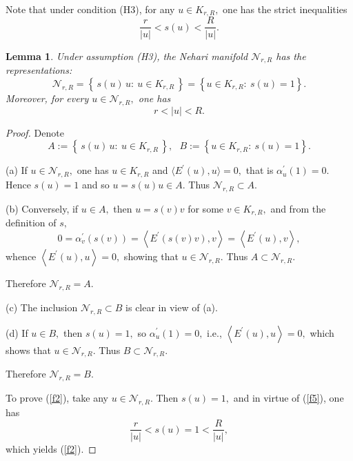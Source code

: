 \documentclass{birkjour}
\newtheorem{lemma}[theorem]{Lemma}
\theoremstyle{definition}
\theoremstyle{remark}
\numberwithin{equation}{section}
\begin{document}
Note that under condition (H3), for any $u\in K_{r,R},$ one has the strict
inequalities%
\begin{equation}
\frac{r}{|u|}<s\left( u\right) <\frac{R}{|u|}.  \label{f5}
\end{equation}

\begin{lemma}
\label{lc copy(1)}Under assumption (H3), the Nehari manifold $\mathcal{N}%
_{r,R}$ has the representations:
\begin{equation*}
\mathcal{N}_{r,R}=\left\{ \,s(u)\,u:\ u\in K_{r,R}\,\right\} =\left\{ u\in
K_{r,R}:\ s\left( u\right) =1\right\} .
\end{equation*}%
Moreover, for every $u\in \mathcal{N}_{r,R},$ one has
\begin{equation}
r<\left\vert u\right\vert <R.  \label{f2}
\end{equation}
\end{lemma}

\begin{proof}
Denote
\begin{equation*}
A:=\left\{ \,s(u)\,u:\ u\in K_{r,R}\,\right\} ,\ \ \ B:=\left\{ u\in
K_{r,R}:\ s\left( u\right) =1\right\} .
\end{equation*}

(a) If $u\in \mathcal{N}_{r,R},$ one has $u\in K_{r,R}$ and $\langle
E^{\prime }(u),u\rangle =0,$ that is $\alpha _{u}^{\prime }\left( 1\right)
=0.$ Hence $s\left( u\right) =1$ and so $u=s\left( u\right) u\in A.$ Thus $%
\mathcal{N}_{r,R}\subset A.$

(b) Conversely, if $u\in A,$ then $u=s\left( v\right) v$ for some $v\in
K_{r,R},$ and from the definition of $s,$
\begin{equation*}
0=\alpha _{v}^{\prime }\left( s\left( v\right) \right) =\left\langle
E^{\prime }\left( s\left( v\right) v\right),v \right\rangle =\left\langle
E^{\prime }\left( u\right) ,v\right\rangle ,
\end{equation*}%
whence $\left\langle E^{\prime }\left( u\right) ,u\right\rangle =0,$ showing
that $u\in \mathcal{N}_{r,R}.$ Thus $A\subset \mathcal{N}_{r,R}.$

Therefore $\mathcal{N}_{r,R}=A.$

(c) The inclusion $\mathcal{N}_{r,R}\subset B$ is clear in view of (a).

(d) If $u\in B,$ then $s\left( u\right) =1,$ so $\alpha _{u}^{\prime }\left(
1\right) =0,$ i.e., $\left\langle E^{\prime }\left( u\right) ,u\right\rangle
=0,$ which shows that $u\in \mathcal{N}_{r,R}.$ Thus $B\subset \mathcal{N}%
_{r,R}.$

Therefore $\mathcal{N}_{r,R}=B.$

To prove (\ref{f2}), take any $u\in \mathcal{N}_{r,R}.$ Then $s\left(
u\right) =1,$ and in virtue of (\ref{f5}), one has
\begin{equation*}
\frac{r}{\left\vert u\right\vert }<s\left( u\right) =1<\frac{R}{\left\vert
u\right\vert },
\end{equation*}%
which yields (\ref{f2}).
\end{proof}
\end{document}
